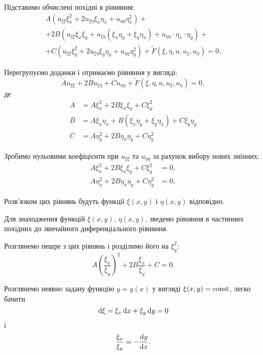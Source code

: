 Підставимо обчислені похідні в рівняння:
\begin{multline}
	A (u_{\xi\xi} \xi_x^2 + 2 u_{\xi\eta} \xi_x \eta_x + u_{\eta\eta} \eta_x^2 ) + \\
	+ 2 B(u_{\xi\xi} \xi_x \xi_y + u_{\xi\eta}(\xi_x\eta_y+\xi_y\eta_x)+u_{\eta\eta}\cdot\eta_x\cdot\eta_y) + \\
	+ C (u_{\xi\xi} \xi_y^2 + 2 u_{\xi\eta}\xi_y\eta_y + u_{\eta\eta}\eta_y^2) + \widetilde{F}(\xi, \eta, u, u_\xi, u_\eta) = 0.
\end{multline}

Перегрупуємо доданки і отримаємо рівняння у вигляді:
\begin{equation}
	\overline{A} u_{\xi\xi} + 2\overline{B}u_{\xi\eta} + \overline{C} u_{\eta\eta} + \widetilde{F}(\xi,\eta,u,u_\xi,u_\eta)=0,
\end{equation}
де 
\begin{align}
	\overline{A} &= A \xi_x^2 + 2 B \xi_x \xi_y + C \xi_y^2 \\
	\overline{B} &= A \xi_x \eta_x + B(\xi_x \eta_y + \xi_y \eta_x) + C \xi_y \eta_y \\
	\overline{C} &= A \eta_y^2 + 2 B \eta_x \eta_y + C \eta_y^2
\end{align}

Зробимо нульовими коефіцієнти при $u_{\xi\xi}$ та $u_{\eta\eta}$ за рахунок вибору нових змінних:
\begin{align}
	A \xi_x^2 + 2 B \xi_x \xi_y + C \xi_y^2 &= 0, \\
	A \eta_x^2 + 2 B \eta_x \eta_y + C \eta_y^2 &= 0,
\end{align}

Розв'язком цих рівнянь будуть функції $\xi(x,y)$ і $\eta(x,y)$ відповідно. \medskip

Для знаходження функцій $\xi(x, y)$, $\eta(x,y)$, зведемо рівняння в частинних похідних до звичайного диференціального рівняння. \medskip

Розглянемо пешре з цих рівнянь і розділимо його на $\xi_y^2$:
\begin{equation}
	A \left( \dfrac{\xi_x}{\xi_y} \right)^2 + 2 B \dfrac{\xi_x}{\xi_y} + C = 0.
\end{equation}

Розглянемо неявно задану функцію $y = y(x)$ у вигляді $\xi(x, y) = \operatorname{const}$, легко бачити
\begin{equation}
	\mathop{}\!\mathrm{d} \xi = \xi_x \mathop{}\!\mathrm{d} x + \xi_y \mathop{}\!\mathrm{d} y = 0
\end{equation}
і
\begin{equation}
	\dfrac{\xi_x}{\xi_y} = - \dfrac{\mathop{}\!\mathrm{d} y}{\mathop{}\!\mathrm{d} x}.
\end{equation}

